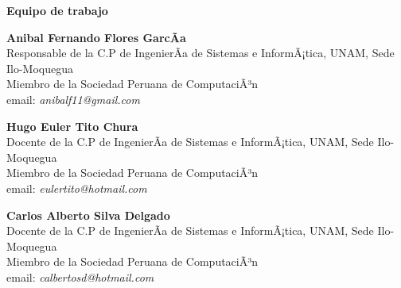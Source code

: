 \begin{center}
{\bf \Huge Equipo de trabajo}
\end{center}
\vspace{1cm}

\begin{center}
\textbf{Anibal Fernando Flores GarcÃ­a}\\
Responsable de la C.P de IngenierÃ­a de Sistemas e InformÃ¡tica, UNAM, Sede Ilo-Moquegua\\
Miembro de la Sociedad Peruana de ComputaciÃ³n\\
email: \textit{anibalf11@gmail.com}\\
\end{center}

\begin{center}
\textbf{Hugo Euler Tito Chura}\\
Docente de la C.P de IngenierÃ­a de Sistemas e InformÃ¡tica, UNAM, Sede Ilo-Moquegua\\
Miembro de la Sociedad Peruana de ComputaciÃ³n\\
email: \textit{eulertito@hotmail.com}\\
\end{center}

\begin{center}
\textbf{Carlos Alberto Silva Delgado}\\
Docente de la C.P de IngenierÃ­a de Sistemas e InformÃ¡tica, UNAM, Sede Ilo-Moquegua\\
Miembro de la Sociedad Peruana de ComputaciÃ³n\\
email: \textit{calbertosd@hotmail.com}\\
\end{center}

